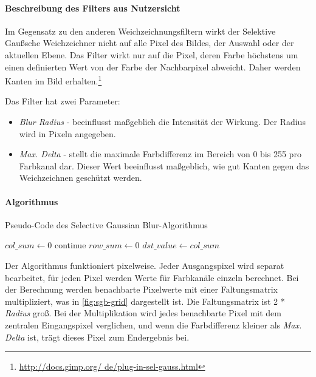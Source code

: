 \paragraph{Beschreibung des Filters aus Nutzersicht}
\glqq Im Gegensatz zu den anderen Weichzeichnungsfiltern wirkt der Selektive Gaußsche Weichzeichner nicht auf alle Pixel des Bildes, der Auswahl oder der aktuellen Ebene. Das Filter wirkt nur auf die Pixel, deren Farbe höchstens um einen definierten Wert von der Farbe der Nachbarpixel abweicht. Daher werden Kanten im Bild erhalten.\glqq\footnote{\url{http://docs.gimp.org/	de/plug-in-sel-gauss.html}} 

Das Filter hat zwei Parameter: 
\begin{itemize}
\item \emph{Blur Radius} - beeinflusst maßgeblich die Intensität der Wirkung. Der Radius wird in Pixeln angegeben.
\item \emph{Max. Delta} - stellt die maximale Farbdifferenz im Bereich von 0 bis 255 pro Farbkanal dar. Dieser Wert beeinflusst maßgeblich, wie gut Kanten
gegen das Weichzeichnen geschützt werden.
\end{itemize}


\paragraph{Algorithmus} 
\begin{algorithm}[h]
\caption{Pseudo-Code des \glqq Selective Gaussian Blur\grqq-Algorithmus}
\label{algo:sel-gaussian}
\begin{algorithmic}[1]
		\State $col\_sum \gets 0$
			\State continue
			\EndIf
			\State $row\_sum \gets 0$
				\EndIf
				\EndIf
			\EndFor
		\EndFor
		\State $dst\_value \gets col\_sum$
	\EndFor
	\EndFor
\EndFor	
\end{algorithmic}
\end{algorithm}

Der Algorithmus funktioniert pixelweise. Jeder Ausgangspixel wird separat bearbeitet, für jeden Pixel werden Werte für Farbkanäle einzeln berechnet. Bei der Berechnung werden benachbarte Pixelwerte mit einer Faltungsmatrix multipliziert, was in \autoref{fig:sgb-grid} dargestellt ist. Die Faltungsmatrix ist 2 * \emph{Radius} groß. Bei der Multiplikation wird jedes benachbarte Pixel mit dem zentralen Eingangspixel verglichen, und wenn die Farbdifferenz kleiner als \emph{Max. Delta} ist, trägt dieses Pixel zum Endergebnis bei. 

